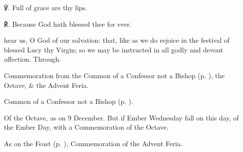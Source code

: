 ℣. Full of grace are thy lips.

℟. Because God hath blessed thee for ever.


\collect
{} hear us, O God of our salvation: that, like as we do rejoice in the festival of blessed Lucy thy Virgin; so we may be instructed in all godly and devout affection. Through.

\begin{rubric}
	Commemoration  from the Common of a Confessor not a Bishop (p. \pageref{ConfessorNotBishopCollect}), the Octave, \& the Advent Feria.
\end{rubric}



\begin{rubric}
	Common of a Confessor not a Bishop (p. \pageref{ConfessorNotBishopCollect}).
\end{rubric}


\clearpage
{}

\begin{rubric}
	Of the Octave, as on 9 December. But if Ember Wednesday fall on this day, of the Ember Day, with a Commemoration of the Octave.
\end{rubric}




\begin{rubric}
	As on the Feast (p. \pageref{ConceptionBVM}), Commemoration of the Advent Feria.
\end{rubric}




